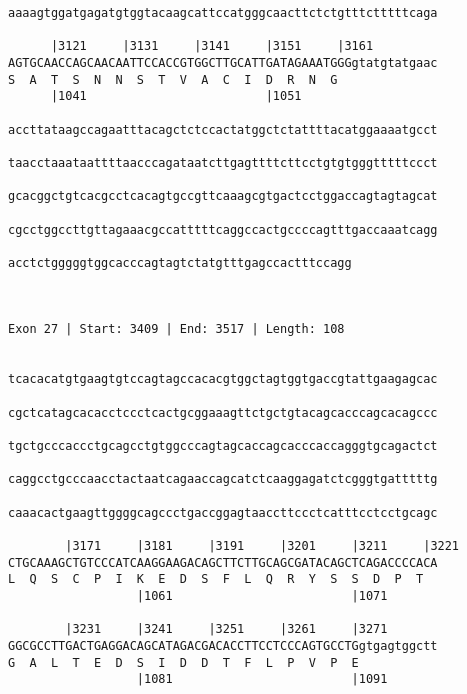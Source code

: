 \documentclass{article}
\begin{document}
\begin{Verbatim}
aaaagtggatgagatgtggtacaagcattccatgggcaacttctctgtttctttttcaga
                                                            
      |3121     |3131     |3141     |3151     |3161         
AGTGCAACCAGCAACAATTCCACCGTGGCTTGCATTGATAGAAATGGGgtatgtatgaac
S  A  T  S  N  N  S  T  V  A  C  I  D  R  N  G              
      |1041                         |1051                   
  
accttataagccagaatttacagctctccactatggctctattttacatggaaaatgcct
                                                            
taacctaaataattttaacccagataatcttgagttttcttcctgtgtgggtttttccct
                                                            
gcacggctgtcacgcctcacagtgccgttcaaagcgtgactcctggaccagtagtagcat
                                                            
cgcctggccttgttagaaacgccatttttcaggccactgccccagtttgaccaaatcagg
                                                            
acctctgggggtggcacccagtagtctatgtttgagccactttccagg
                                                
                                                
 
Exon 27 | Start: 3409 | End: 3517 | Length: 108


tcacacatgtgaagtgtccagtagccacacgtggctagtggtgaccgtattgaagagcac
                                                            
cgctcatagcacacctccctcactgcggaaagttctgctgtacagcacccagcacagccc
                                                            
tgctgcccaccctgcagcctgtggcccagtagcaccagcacccaccagggtgcagactct
                                                            
caggcctgcccaacctactaatcagaaccagcatctcaaggagatctcgggtgatttttg
                                                            
caaacactgaagttggggcagccctgaccggagtaaccttccctcatttcctcctgcagc
                                                            
        |3171     |3181     |3191     |3201     |3211     |3221
CTGCAAAGCTGTCCCATCAAGGAAGACAGCTTCTTGCAGCGATACAGCTCAGACCCCACA
L  Q  S  C  P  I  K  E  D  S  F  L  Q  R  Y  S  S  D  P  T  
                  |1061                         |1071       
  
        |3231     |3241     |3251     |3261     |3271       
GGCGCCTTGACTGAGGACAGCATAGACGACACCTTCCTCCCAGTGCCTGgtgagtggctt
G  A  L  T  E  D  S  I  D  D  T  F  L  P  V  P  E           
                  |1081                         |1091
  

\end{Verbatim}
\end{document}
